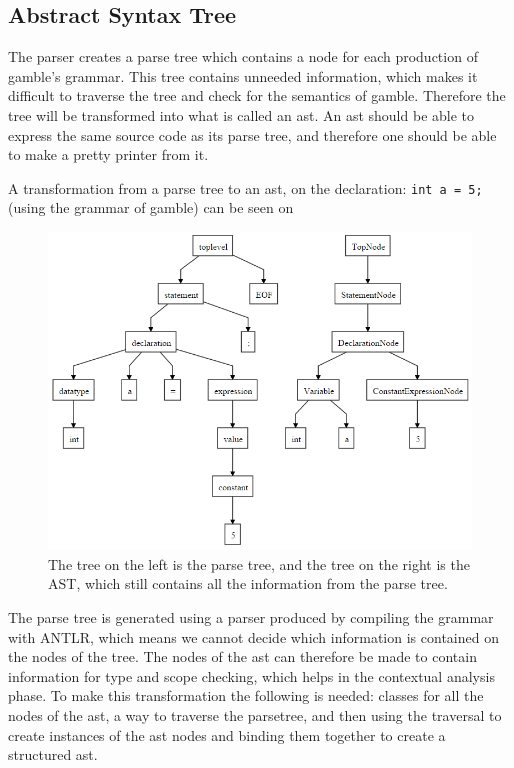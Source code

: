 \subsection*{Abstract Syntax Tree}\label{sec:AST}
The parser creates a parse tree which contains a node for each production of \gls{gamble}'s grammar.
This tree contains unneeded information, which makes it difficult to traverse the tree and check for the semantics of \gls{gamble}.
Therefore the tree will be transformed into what is called an \acrfull{ast}.
An \acrshort{ast} should be able to express the same source code as its parse tree, and therefore one should be able to make a pretty printer from it.


A transformation from a parse tree to an \acrshort{ast}, on the declaration: \texttt{int a = 5;} (using the grammar of \gls{gamble}) can be seen on 

\begin{figure}
		\centering
	 	\includegraphics[width=0.8\linewidth]{figures/Trees/AST.PNG}
		\caption{The tree on the left is the parse tree, and the tree on the right is the AST, which still contains all the information from the parse tree.}\label{image:AST}
\end{figure}

The parse tree is generated using a parser produced by compiling the grammar with ANTLR, which means we cannot decide which information is contained on the nodes of the tree.
The nodes of the \acrshort{ast} can therefore be made to contain information for type and scope checking, which helps in the contextual analysis phase.
To make this transformation the following is needed: classes for all the nodes of the \acrshort{ast}, a way to traverse the parsetree, and then using the traversal to create instances of the \acrshort{ast} nodes and binding them together to create a structured \acrshort{ast}.



